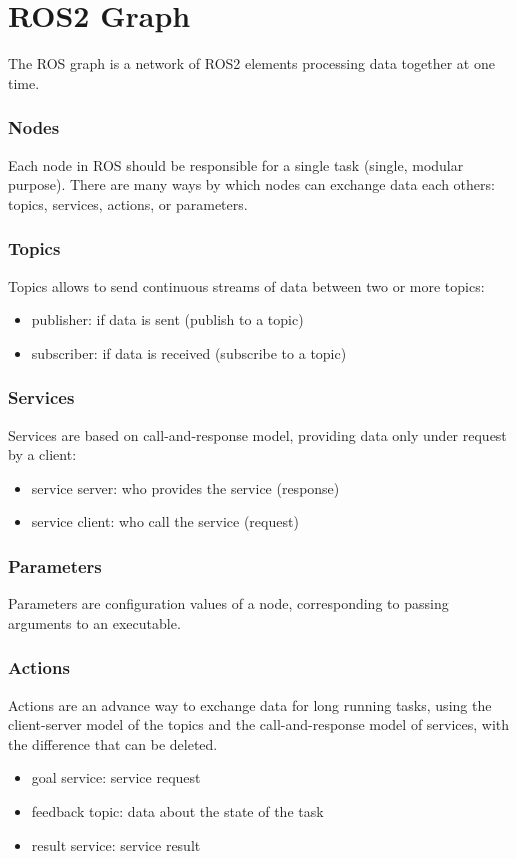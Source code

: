 \part{ROS2 Graph}

  The ROS graph is a network of ROS2 elements processing data 
  together at one time.


  \section*{Nodes}
    Each node in ROS should be responsible for a single task (single, modular purpose).
    There are many ways by which nodes can exchange data each 
    others: topics, services, actions, or parameters.


  \section*{Topics}
    Topics allows to send continuous streams of data between
    two or more topics:
    \begin{itemize}
      \item publisher: if data is sent (publish to a topic)
      \item subscriber: if data is received (subscribe to a topic)
    \end{itemize}


  \section*{Services}
    Services are based on call-and-response model, providing data
    only under request by a client:
    \begin{itemize}
      \item service server: who provides the service (response)
      \item service client: who call the service (request)
    \end{itemize}


  \section*{Parameters}
    Parameters are configuration values of a node, corresponding
    to passing arguments to an executable.


  \section*{Actions}
    Actions are an advance way to exchange data for long running
    tasks, using the client-server model of the topics and 
    the call-and-response model of services, with the difference 
    that can be deleted.
    \begin{itemize}
      \item goal service: service request
      \item feedback topic: data about the state of the task
      \item result service: service result
    \end{itemize}





